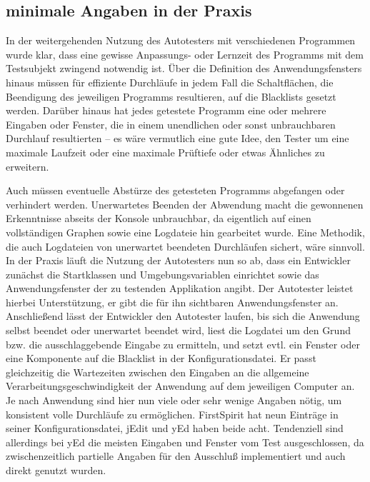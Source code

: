 \subsection{\glqq{}minimale\grqq{} Angaben in der Praxis}

In der weitergehenden Nutzung des Autotesters mit verschiedenen
Programmen wurde klar, dass eine gewisse Anpassungs- oder
Lernzeit des Programms mit dem Testsubjekt zwingend notwendig ist.
Über die Definition des Anwendungsfensters hinaus müssen für
effiziente Durchläufe in jedem Fall die Schaltflächen, die Beendigung
des jeweiligen Programms resultieren, auf die Blacklists gesetzt
werden. Darüber hinaus hat jedes getestete Programm eine oder
mehrere Eingaben oder Fenster, die in einem unendlichen oder
sonst unbrauchbaren Durchlauf resultierten -- es wäre vermutlich
eine gute Idee, den Tester um eine maximale Laufzeit oder
eine maximale Prüftiefe oder etwas Ähnliches zu erweitern.

Auch müssen eventuelle Abstürze des getesteten Programms
abgefangen oder verhindert werden. Unerwartetes Beenden
der Abwendung macht die gewonnenen Erkenntnisse abseits
der Konsole unbrauchbar, da eigentlich auf einen
vollständigen Graphen sowie eine Logdateie hin gearbeitet wurde.
Eine Methodik, die auch Logdateien von unerwartet beendeten
Durchläufen sichert, wäre sinnvoll. In der Praxis läuft
die Nutzung der Autotesters nun so ab, dass ein Entwickler
zunächst die Startklassen und Umgebungsvariablen einrichtet
sowie das Anwendungsfenster der zu testenden Applikation
angibt. Der Autotester leistet hierbei Unterstützung, er
gibt die für ihn sichtbaren Anwendungsfenster an. Anschließend
lässt der Entwickler den Autotester laufen, bis sich die Anwendung
selbst beendet oder unerwartet beendet wird, liest die Logdatei
um den Grund bzw. die ausschlaggebende Eingabe zu ermitteln,
und setzt evtl. ein Fenster oder eine Komponente auf die
Blacklist in der Konfigurationsdatei. Er passt gleichzeitig
die Wartezeiten zwischen den Eingaben an die allgemeine
Verarbeitungsgeschwindigkeit der Anwendung auf dem jeweiligen
Computer an. Je nach Anwendung sind hier nun viele oder
sehr wenige Angaben nötig, um konsistent volle Durchläufe
zu ermöglichen. FirstSpirit hat neun Einträge
in seiner Konfigurationsdatei, jEdit und yEd haben beide
acht. Tendenziell sind allerdings bei yEd die meisten Eingaben
und Fenster vom Test ausgeschlossen, da zwischenzeitlich
partielle Angaben für den Ausschluß implementiert und auch
direkt genutzt wurden.
